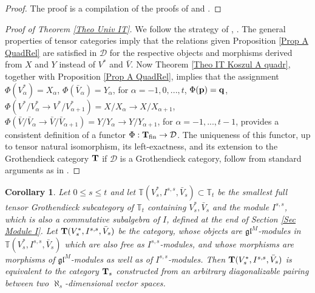 \documentclass[12pt]{article}
\def\TT {{\mathbb T}}     %
\def\mc {\mathcal}
\def\mk {\mathfrak}
\newtheorem{coro}[theorem]{Corollary}
\begin{document}
\begin{proof}
The proof is a compilation of the proofs of \cite[Lemma 5.16]{Chirvasitu-Penkov-RC} and \cite[Theorem 3.33]{Chirvasitu-Penkov-UTC}.
\end{proof}


\begin{proof}[Proof of Theorem \ref{Theo Univ IT}]
We follow the strategy of \cite[Theorem 3.33]{Chirvasitu-Penkov-UTC}, \cite[Theorem 5.3]{Chirvasitu-Penkov-RC}. The general properties of tensor categories imply that the relations given Proposition \ref{Prop A QuadRel} are satisfied in $\mc D$ for the respective objects and morphisms derived from $X$ and $Y$ instead of $V^*$ and $\bar V$. Now Theorem \ref{Theo IT Koszul A quadr}, together with Proposition \ref{Prop A QuadRel}, implies that the assignment $\Phi(V^*_\alpha)=X_\alpha$, $\Phi(\bar V_\alpha)=Y_\alpha$, for $\alpha=-1,0,...,t$, $\Phi({\bf p})={\bf q}$, $\Phi(V^*/V^*_\alpha\to V^*/V^*_{\alpha+1})=X/X_{\alpha}\to X/X_{\alpha+1}$, $\Phi(\bar V/\bar V_\alpha\to\bar V/\bar V_{\alpha+1})=Y/Y_{\alpha}\to Y/Y_{\alpha+1}$, for $\alpha=-1,...,t-1$, provides a consistent definition of a functor $\Phi:{\bf T}_{\rm fin}\to\mc D$. The uniqueness of this functor, up to tensor natural isomorphism, its left-exactness, and its extension to the Grothendieck category ${\bf T}$ if $\mc D$ is a Grothendieck category, follow from standard arguments as in \cite[\S 8]{Chirvasitu-Penkov-UTC}.
\end{proof}


\begin{coro}\label{Coro ITs is ITVsWs}
Let $0\leq s\leq t$ and let $\TT(V^*_s,I^{s,s},\bar V_s)\subset \TT_t$ be the smallest full tensor Grothendieck subcategory of $\TT_t$ containing $V^*_s,\bar V_s$ and the module $I^{s,s}$, which is also a commutative subalgebra of $I$, defined at the end of Section \ref{Sec Module I}. Let ${\bf T}(V^*_s,I^{s,s},\bar V_s)$ be the category, whose objects are $\mk{gl}^M$-modules in $\TT(V^*_s,I^{s,s},\bar V_s)$ which are also free as $I^{s,s}$-modules, and whose morphisms are morphisms of $\mk{gl}^M$-modules as well as of $I^{s,s}$-modules. Then ${\bf T}(V^*_s,I^{s,s},\bar V_s)$ is equivalent to the category ${\bf T}_s$ constructed from an arbitrary diagonalizable pairing between two $\aleph_s$-dimensional vector spaces.
\end{coro}




\end{document}
